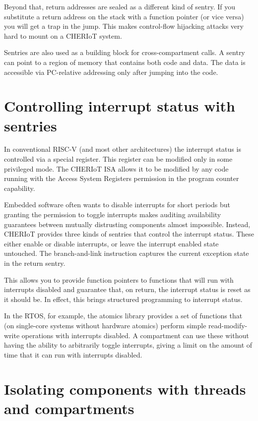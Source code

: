 Beyond that, return addresses are sealed as a different kind of sentry.
If you substitute a return address on the stack with a function pointer (or vice versa) you will get a trap in the jump.
This makes control-flow hijacking attacks very hard to mount on a CHERIoT system.

Sentries are also used as a building block for cross-compartment calls.
A sentry can point to a region of memory that contains both code and data.
The data is accessible via PC-relative addressing only after jumping into the code.

\section[label=interrupt_sentries]{Controlling interrupt status with sentries}

In conventional RISC-V (and most other architectures) the interrupt status is controlled via a special register.
This register can be modified only in some privileged mode.
The CHERIoT ISA allows it to be modified by any code running with the Access System Registers permission in the program counter capability.

Embedded software often wants to disable interrupts for short periods but granting the permission to toggle interrupts makes auditing availability guarantees between mutually distrusting components almost impossible.
Instead, CHERIoT provides three kinds of sentries that control the interrupt status.
These either enable or disable interrupts, or leave the interrupt enabled state untouched.
The branch-and-link instruction captures the current exception state in the return sentry.

This allows you to provide function pointers to functions that will run with interrupts disabled and guarantee that, on return, the interrupt status is reset as it should be.
In effect, this brings structured programming to interrupt status.

In the RTOS, for example, the atomics library provides a set of functions that (on single-core systems without hardware atomics) perform simple read-modify-write operations with interrupts disabled.
A compartment can use these without having the ability to arbitrarily toggle interrupts, giving a limit on the amount of time that it can run with interrupts disabled.

\section{Isolating components with threads and compartments}

